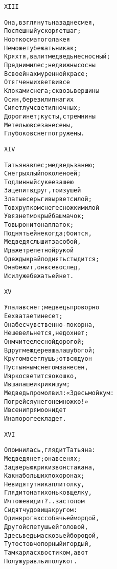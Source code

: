 \begin{minipage}[t]{\dimexpr 0.5\textwidth -\tabcolsep-.5pt}
\begin{alltt}\normalfont\centering
XIII

Она, взглянуть назад не смея,
Поспешный ускоряет шаг;
Но от косматого лакея
Не может убежать никак;
Кряхтя, валит медведь несносный;
Пред ними лес; недвижны сосны
В своей нахмуренной красе;
Отягчены их ветви все
Клоками снега; сквозь вершины
Осин, берез и лип нагих
Сияет луч светил ночных;
Дороги нет; кусты, стремнины
Метелью все занесены,
Глубоко в снег погружены.
\end{alltt}
\end{minipage}

\begin{minipage}[t]{\dimexpr 0.5\textwidth -\tabcolsep-.5pt}
\begin{alltt}\normalfont\centering
XIV

Татьяна в лес; медведь за нею;
Снег рыхлый по колено ей;
То длинный сук ее за шею
Зацепит вдруг, то из ушей
Златые серьги вырвет силой;
То в хрупком снеге с ножки милой
Увязнет мокрый башмачок;
То выронит она платок;
Поднять ей некогда; боится,
Медведя слышит за собой,
И даже трепетной рукой
Одежды край поднять стыдится;
Она бежит, он все вослед,
И сил уже бежать ей нет.
\end{alltt}
\end{minipage}
\clearpage

\begin{minipage}[t]{\dimexpr 0.5\textwidth -\tabcolsep-.5pt}
\begin{alltt}\normalfont\centering
XV

Упала в снег; медведь проворно
Ее хватает и несет;
Она бесчувственно-покорна,
Не шевельнется, не дохнет;
Он мчит ее лесной дорогой;
Вдруг меж дерев шалаш убогой;
Кругом все глушь; отвсюду он
Пустынным снегом занесен,
И ярко светится окошко,
И в шалаше и крик и шум;
Медведь промолвил: «Здесь мой кум:
Погрейся у него немножко!»
И в сени прямо он идет
И на порог ее кладет.
\end{alltt}
\end{minipage}

\begin{minipage}[t]{\dimexpr 0.5\textwidth -\tabcolsep-.5pt}
\begin{alltt}\normalfont\centering
XVI

Опомнилась, глядит Татьяна:
Медведя нет; она в сенях;
За дверью крик и звон стакана,
Как на больших похоронах;
Не видя тут ни капли толку,
Глядит она тихонько в щелку,
И что же видит?.. за столом
Сидят чудовища кругом:
Один в рогах с собачьей мордой,
Другой с петушьей головой,
Здесь ведьма с козьей бородой,
Тут остов чопорный и гордый,
Там карла с хвостиком, а вот
Полужуравль и полукот.
\end{alltt}
\end{minipage}
\clearpage

